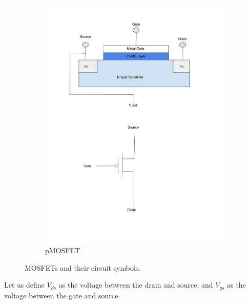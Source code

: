\documentclass[
  reprint,
  amsmath,amssymb,
  aps
]{revtex4-1}
\begin{document}
\begin{figure}[H]
\begin{subfigure}[b]{0.45\textwidth}
        \includegraphics[width=\linewidth]{pmosfet.png}
        \caption{pMOSFET}
        \label{fig:pmosfet}
    \end{subfigure}
    \caption{MOSFETs and their circuit symbols.}
    \label{fig:mosfet}
\end{figure}
Let us define $V_{ds}$ as the voltage between the drain and source, and $V_{gs}$ as the voltage between the gate and source.
\end{document}
